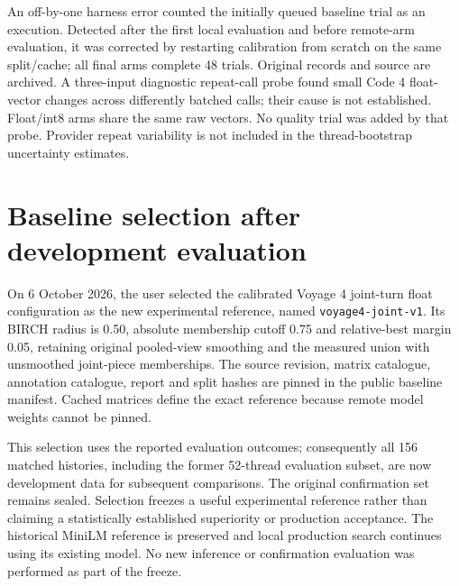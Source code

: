\documentclass[11pt]{article}
\begin{document}
An off-by-one harness error counted the initially queued baseline trial as an
execution. Detected after the first local evaluation and before remote-arm
evaluation, it was corrected by restarting calibration from scratch on the
same split/cache; all final arms complete 48 trials. Original records and
source are archived. A three-input diagnostic repeat-call probe found small
Code 4 float-vector changes across differently batched calls; their cause is
not established. Float/int8 arms share the same raw vectors. No quality trial
was added by that probe. Provider repeat variability is not included in the
thread-bootstrap uncertainty estimates.

\section{Baseline selection after development evaluation}
On 6 October 2026, the user selected the calibrated Voyage 4 joint-turn float
configuration as the new experimental reference, named
\texttt{voyage4-joint-v1}. Its BIRCH radius is 0.50, absolute membership
cutoff 0.75 and relative-best margin 0.05, retaining original pooled-view
smoothing and the measured union with unsmoothed joint-piece memberships.
The source revision, matrix catalogue, annotation catalogue, report and split
hashes are pinned in the public baseline manifest. Cached matrices define
the exact reference because remote model weights cannot be pinned.

This selection uses the reported evaluation outcomes; consequently all 156
matched histories, including the former 52-thread evaluation subset, are now
development data for subsequent comparisons. The original confirmation set
remains sealed. Selection freezes a useful experimental reference rather than
claiming a statistically established superiority or production acceptance.
The historical MiniLM reference is preserved and local production search
continues using its existing model. No new inference or confirmation evaluation
was performed as part of the freeze.


\end{document}
